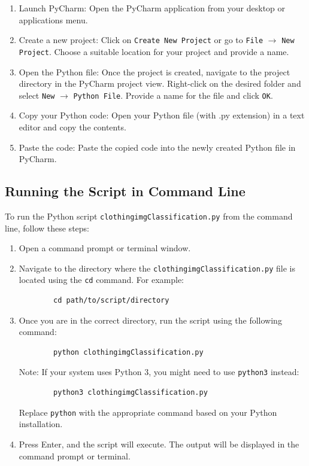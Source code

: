 \begin{enumerate}
	\item Launch PyCharm: Open the PyCharm application from your desktop or applications menu.
	\item Create a new project: Click on \texttt{Create New Project} or go to \texttt{File} $\rightarrow$ \texttt{New Project}. Choose a suitable location for your project and provide a name.
	\item Open the Python file: Once the project is created, navigate to the project directory in the PyCharm project view. Right-click on the desired folder and select \texttt{New} $\rightarrow$ \texttt{Python File}. Provide a name for the file and click \texttt{OK}.
	\item Copy your Python code: Open your Python file (with .py extension) in a text editor and copy the contents.
	\item Paste the code: Paste the copied code into the newly created Python file in PyCharm.
\end{enumerate}

\subsection{Running the Script in Command Line}

To run the Python script \texttt{clothingimgClassification.py} from the command line, follow these steps:

\begin{enumerate}
	\item Open a command prompt or terminal window.
	\item Navigate to the directory where the \texttt{clothingimgClassification.py} file is located using the \texttt{cd} command. For example:
	
	\begin{verbatim}
		cd path/to/script/directory
	\end{verbatim}
	
	\item Once you are in the correct directory, run the script using the following command:
	
	\begin{verbatim}
		python clothingimgClassification.py
	\end{verbatim}
	
	Note: If your system uses Python 3, you might need to use \texttt{python3} instead:
	
	\begin{verbatim}
		python3 clothingimgClassification.py
	\end{verbatim}
	
	Replace \texttt{python} with the appropriate command based on your Python installation.
	
	\item Press Enter, and the script will execute. The output will be displayed in the command prompt or terminal.
\end{enumerate}


